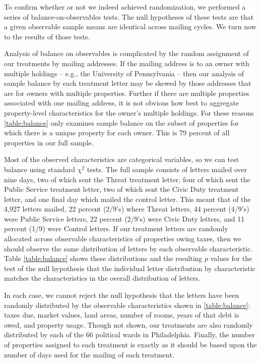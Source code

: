 \documentclass[12pt,titlepage]{article}
\begin{document}
To confirm whether or not we indeed achieved randomization, we
performed a series of balance-on-observables tests. The null
hypotheses of these tests are that a given observable sample means are
identical across mailing cycles. We turn now to the results of those
tests.

Analysis of balance on observables is complicated by the random assignment 
of our treatments by mailing addresses.   If the mailing address is to an 
owner with multiple holdings – e.g., the University of Pennsylvania – then 
our analysis of sample balance by each treatment letter may be skewed by 
those addresses that are for owners with multiple properties.   Further if 
there are multiple properties associated with one mailing address, it is 
not obvious how best to aggregate property-level characteristics for the 
owner’s multiple holdings.  For these reasons \ref{table:balance} only examines sample 
balance on the subset of properties for which there is a unique property 
for each owner.  This is 79 percent of all properties in our full sample.  
  
Most of the observed characteristics are categorical variables, so we
can test balance using standard $\chi^2$ tests. The full sample
consists of letters mailed over nine days, two of which sent the
Threat treatment letter, four of which sent the Public Service
treatment letter, two of which sent the Civic Duty treatment letter,
and one final day which mailed the control letter.  This meant that of
the 4,927 letters mailed, 22 percent (2/9's) where Threat letters, 44
percent (4/9's) were Public Service letters, 22 percent (2/9's) were
Civic Duty letters, and 11 percent (1/9) were Control letters.  If our
treatment letters are randomly allocated across observable
characteristics of properties owing taxes, then we should observe the
same distribution of letters by each observable characteristic.  Table
\ref{table:balance} shows these distributions and the resulting $p$
values for the test of the null hypothesis that the individual letter
distribution by characteristic matches the characteristics in the overall distribution of
letters. 

In each case, we cannot reject the null hypothesis that the letters have 
been randomly distributed by the observable characteristics shown in 
\ref{table:balance}: taxes due, market values, land areas, number of rooms, 
years of that debt is owed, and property usage.   Though not shown, our 
treatments are also randomly distributed by each of the 66 political 
wards in Philadelphia.  Finally, the number of properties assigned to 
each treatment is exactly as it should be based upon the number of 
days used for the mailing of each treatment.  
\end{document}
